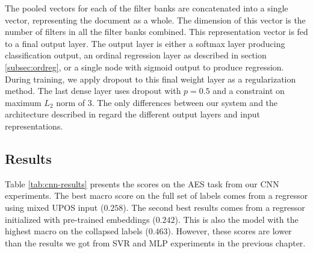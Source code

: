 The pooled vectors for each of the filter banks are concatenated into a
single vector, representing the document as a whole. The dimension of this
vector is the number of filters in all the filter banks combined. This
representation vector is fed to a final output layer. The output layer is
either a softmax layer producing classification output, an ordinal regression
layer as described in section \ref{subsec:ordreg}, or a single node with
sigmoid output to produce regression. During training, we apply dropout to
this final weight layer as a regularization method. The last dense layer uses
dropout with $p=0.5$ and a constraint on maximum $L_2$ norm of 3. The only
differences between our system and the architecture described in
\textcite{kim2014convolutional} regard the different output layers and input
representations.


\subsection{Results}

Table \ref{tab:cnn-results} presents the \FI scores on the \ac{AES} task from
our \ac{CNN} experiments. The best macro \FI score on the full set of labels
comes from a regressor using mixed UPOS input ($0.258$). The second best
results comes from a regressor initialized with pre-trained embeddings
($0.242$). This is also the model with the highest macro \FI on the collapsed
labels ($0.463$). However, these scores are lower than the results we got
from SVR and MLP experiments in the previous chapter.

